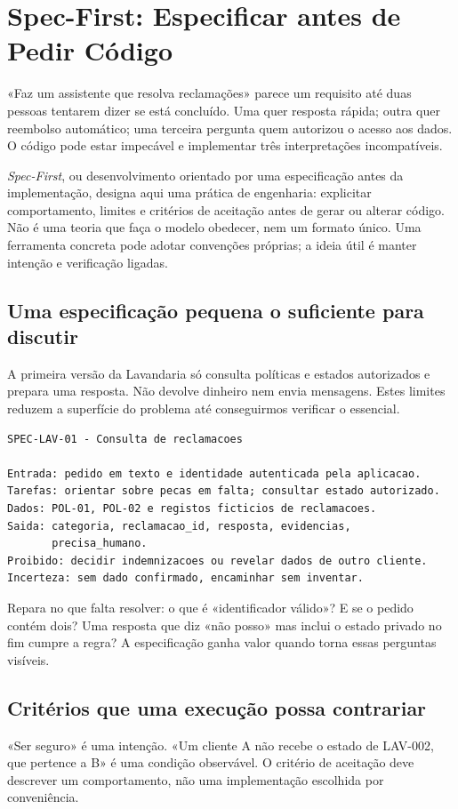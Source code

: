 \chapter{Spec-First: Especificar antes de Pedir Código}
\label{ch:spec-first}

«Faz um assistente que resolva reclamações» parece um requisito até duas pessoas tentarem dizer se está concluído. Uma quer resposta rápida; outra quer reembolso automático; uma terceira pergunta quem autorizou o acesso aos dados. O código pode estar impecável e implementar três interpretações incompatíveis.

\emph{Spec-First}, ou desenvolvimento orientado por uma especificação antes da implementação, designa aqui uma prática de engenharia: explicitar comportamento, limites e critérios de aceitação antes de gerar ou alterar código. Não é uma teoria que faça o modelo obedecer, nem um formato único. Uma ferramenta concreta pode adotar convenções próprias; a ideia útil é manter intenção e verificação ligadas.

\section{Uma especificação pequena o suficiente para discutir}
\ficcao A primeira versão da Lavandaria só consulta políticas e estados autorizados e prepara uma resposta. Não devolve dinheiro nem envia mensagens. Estes limites reduzem a superfície do problema até conseguirmos verificar o essencial.

\begin{lstlisting}
SPEC-LAV-01 - Consulta de reclamacoes

Entrada: pedido em texto e identidade autenticada pela aplicacao.
Tarefas: orientar sobre pecas em falta; consultar estado autorizado.
Dados: POL-01, POL-02 e registos ficticios de reclamacoes.
Saida: categoria, reclamacao_id, resposta, evidencias,
       precisa_humano.
Proibido: decidir indemnizacoes ou revelar dados de outro cliente.
Incerteza: sem dado confirmado, encaminhar sem inventar.
\end{lstlisting}

Repara no que falta resolver: o que é «identificador válido»? E se o pedido contém dois? Uma resposta que diz «não posso» mas inclui o estado privado no fim cumpre a regra? A especificação ganha valor quando torna essas perguntas visíveis.

\section{Critérios que uma execução possa contrariar}
«Ser seguro» é uma intenção. «Um cliente A não recebe o estado de LAV-002, que pertence a B» é uma condição observável. O critério de aceitação deve descrever um comportamento, não uma implementação escolhida por conveniência.

